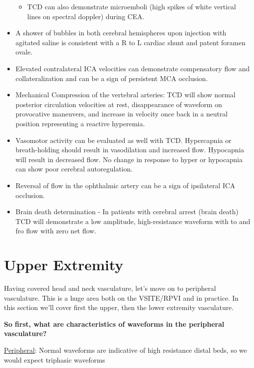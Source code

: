 \documentclass[
]{book}
\providecommand{\tightlist}{%
  \setlength{\itemsep}{0pt}\setlength{\parskip}{0pt}}
\begin{document}
\begin{itemize}
  \begin{itemize}
  \tightlist
  \item
    TCD can also demonstrate microemboli (high spikes of white
    vertical lines on spectral doppler) during CEA.
  \end{itemize}
\item
  A shower of bubbles in both cerebral hemispheres upon injection with
  agitated saline is consistent with a R to L cardiac shunt and patent
  foramen ovale.\citep{zito2009}
\item
  Elevated contralateral ICA velocities can demonstrate compensatory
  flow and collateralization and can be a sign of persistent MCA
  occlusion.
\item
  Mechanical Compression of the vertebral arteries: TCD will show
  normal posterior circulation velocities at rest, disappearance of
  waveform on provocative maneuvers, and increase in velocity once
  back in a neutral position representing a reactive
  hyperemia.\citep{vilela2005}
\item
  Vasomotor activity can be evaluated as well with TCD. Hypercapnia or
  breath-holding should result in vasodilation and increased flow.
  Hypocapnia will result in decreased flow. No change in response to
  hyper or hypocapnia can show poor cerebral
  autoregulation.\citep{müller1995}
\item
  Reversal of flow in the ophthalmic artery can be a sign of
  ipsilateral ICA occlusion.\citep{guan2013}
\item
  Brain death determination - In patients with cerebral arrest (brain
  death) TCD will demonstrate a low amplitude, high-resistance
  waveform with to and fro flow with zero net flow.
\end{itemize}

\hypertarget{upper-extremity}{%
\section{Upper Extremity}\label{upper-extremity}}

Having covered head and neck vasculature, let's move on to peripheral
vasculature. This is a huge area both on the VSITE/RPVI and in practice.
In this section we'll cover first the upper, then the lower extremity
vasculature.

\textbf{So first, what are characteristics of waveforms in the peripheral
vasculature?}

\uline{Peripheral}: Normal waveforms are indicative of high
resistance distal beds, so we would expect triphasic waveforms
\end{document}
